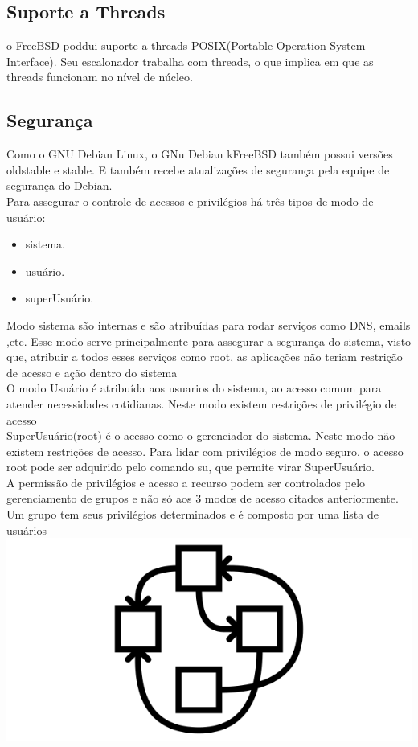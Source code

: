 \documentclass[conference]{IEEEtran}
\begin{document}
\subsection{Suporte a Threads}\label{sec:BSDThreads}
o FreeBSD poddui suporte a threads POSIX(Portable Operation System Interface). Seu escalonador trabalha com threads, o que implica em que as threads funcionam no nível de núcleo.\cite{DesignImplementationFreeBSD}

\subsection{Segurança}\label{sec:BSDSec}
Como o GNU Debian Linux, o GNu Debian kFreeBSD também possui versões oldstable e stable. E também recebe atualizações de segurança pela equipe de segurança do Debian.\cite{DebiankFreeBSDVersions}\\
Para assegurar o controle de acessos e privilégios há três tipos de modo de usuário:
\begin{itemize}
	\item sistema.
	\item usuário.
	\item superUsuário.
\end{itemize}
Modo sistema são internas e são atribuídas para rodar serviços como DNS, emails ,etc. Esse modo serve principalmente para assegurar a segurança do sistema, visto que, atribuir a todos esses serviços como root, as aplicações não teriam restrição de acesso e ação dentro do sistema \\
O modo Usuário é atribuída aos usuarios do sistema, ao acesso comum para atender necessidades cotidianas. Neste modo existem restrições de privilégio de acesso \\
SuperUsuário(root) é o acesso como o gerenciador do sistema. Neste modo não existem restrições de acesso. Para lidar com privilégios de modo seguro, o acesso root pode ser adquirido pelo comando su, que permite virar SuperUsuário. \\
A permissão de privilégios e acesso a recurso podem ser controlados pelo 
gerenciamento de grupos e não só aos 3 modos de acesso citados anteriormente. Um grupo tem seus privilégios determinados e é composto por uma lista de usuários \\

\includegraphics[scale = 0.5]{Hurd.png}\\
\end{document}
